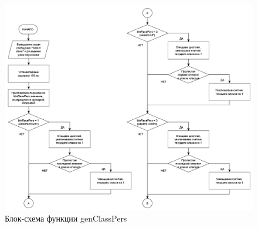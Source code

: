 \documentclass{altsu-report}
\begin{document}
\begin{figure}[H]
    \centering
    \includegraphics[scale=0.8]{genClassPers1.png}
    \caption{Блок-схема функции genClassPers}
    \label{fig:class1}
\end{figure}
\end{document}
